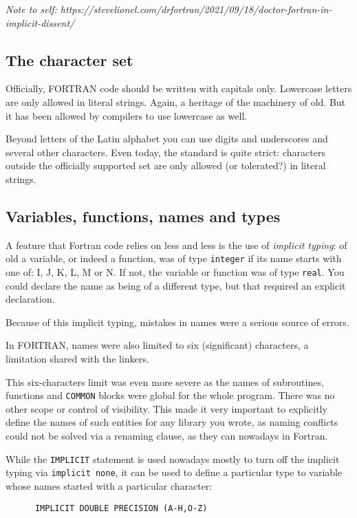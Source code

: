 \emph{Note to self: https://stevelionel.com/drfortran/2021/09/18/doctor-fortran-in-implicit-dissent/
}


\subsection{The character set}
Officially, FORTRAN code should be written with capitals only. Lowercase letters are only
allowed in literal strings. Again, a heritage of the machinery of old. But it has been
allowed by compilers to use lowercase as well.

Beyond letters of the Latin alphabet you can use digits and underscores and several other characters.
Even today, the standard is quite strict: characters outside the officially supported set are only
allowed (or tolerated?) in literal strings.


\subsection{Variables, functions, names and types}
A feature that Fortran code relies on less and less is the use of \emph{implicit typing}: of old
a variable, or indeed a function, was of type \verb+integer+ if its name starts with one of: I, J, K, L, M or N.
If not, the variable or function was of type \verb+real+. You could declare the name as being of a different type, but
that required an explicit declaration.

Because of this implicit typing, mistakes in names were a serious source of errors.

In FORTRAN, names were also limited to six (significant) characters, a limitation shared with the linkers.

This six-characters limit was even more severe as the names of subroutines, functions and \verb+COMMON+ blocks
were global for the whole program. There was no other scope or control of visibility. This made it
very important to explicitly define the names of such entities for any library you wrote, as naming conflicts
could not be solved via a renaming clause, as they can nowadays in Fortran.

While the \verb+IMPLICIT+ statement is used nowadays mostly to turn off the implicit typing via \verb+implicit none+,
it can be used to define a particular type to variable whose names started with a particular character:
\begin{verbatim}
      IMPLICIT DOUBLE PRECISION (A-H,O-Z)
\end{verbatim}

